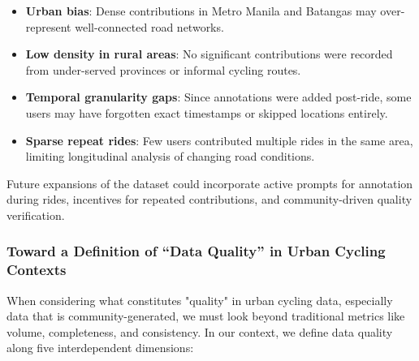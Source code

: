 \begin{itemize}
\item \textbf{Urban bias}: Dense contributions in Metro Manila and Batangas may over-represent well-connected road networks.
\item \textbf{Low density in rural areas}: No significant contributions were recorded from under-served provinces or informal cycling routes.
\item \textbf{Temporal granularity gaps}: Since annotations were added post-ride, some users may have forgotten exact timestamps or skipped locations entirely.
\item \textbf{Sparse repeat rides}: Few users contributed multiple rides in the same area, limiting longitudinal analysis of changing road conditions.
\end{itemize}

Future expansions of the dataset could incorporate active prompts for annotation during rides, incentives for repeated contributions, and community-driven quality verification.

\subsubsection{Toward a Definition of “Data Quality” in Urban Cycling Contexts}

When considering what constitutes "quality" in urban cycling data, especially data that is community-generated, we must look beyond traditional metrics like volume, completeness, and consistency. In our context, we define data quality along five interdependent dimensions:

